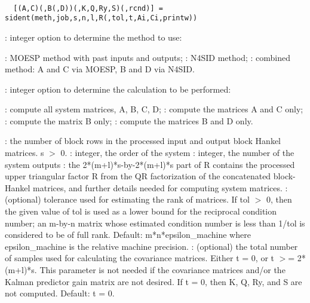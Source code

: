 \begin{mandesc}
   \\ %
\end{mandesc}
\begin{calling_sequence}
\begin{verbatim}
  [(A,C)(,B(,D))(,K,Q,Ry,S)(,rcnd)] = sident(meth,job,s,n,l,R(,tol,t,Ai,Ci,printw))  
\end{verbatim}
\end{calling_sequence}
\begin{parameters}
  \begin{varlist}
    : integer option to determine the method to use:
    \begin{varlist}
      : MOESP method with past inputs and outputs;
      : N4SID method;
      : combined method: A and C via MOESP, B and D via N4SID.
    \end{varlist}
    : integer option to determine the calculation to be performed:
    \begin{varlist}
      : compute all system matrices, A, B, C, D;
      : compute the matrices A and C only;
      : compute the matrix B only;
      : compute the matrices B and D only.
    \end{varlist}
    : the number of block rows in the processed input and output block Hankel matrices.  s $>$ 0.
    : integer, the order of the system
    : integer, the number of the system outputs
    : the 2*(m+l)*s-by-2*(m+l)*s part of  R  contains the processed upper triangular factor  R  from the QR factorization of the concatenated block-Hankel matrices, and further details needed for computing system matrices.
    : (optional) tolerance used for estimating the rank of matrices. If  tol $>$ 0,  then the given value of  tol  is used as a lower bound for the reciprocal condition number; an m-by-n matrix whose estimated condition number is less than  1/tol  is considered to be of full rank. Default:    m*n*epsilon\_machine where epsilon\_machine is the relative machine precision.
    : (optional) the total number of samples used for calculating the covariance matrices.  Either t = 0, or t $>$= 2*(m+l)*s. This parameter is not needed if the covariance matrices and/or the Kalman predictor gain matrix are not desired. If t = 0, then K, Q, Ry, and S are not computed. Default:    t = 0.

\end{varlist}
\end{parameters}
